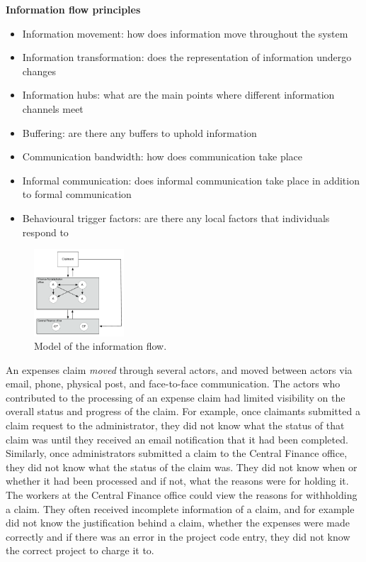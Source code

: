 \begin{framed}\noindent
\textbf{Information flow principles}
\begin{itemize}
\item Information movement: how does information move throughout the system
\item Information transformation: does the representation of information undergo changes
\item Information hubs: what are the main points where different information channels meet
\item Buffering: are there any buffers to uphold information
\item Communication bandwidth: how does communication take place
\item Informal communication: does informal communication take place in addition to formal communication
\item Behavioural trigger factors: are there any local factors that individuals respond to
\end{itemize}
\end{framed}

\begin{figure}[!ht]
\centering
\includegraphics[width=0.3\textwidth]{images/ch12/ch12_infmodel.pdf}
\caption[Study 2 Information flow model]{Model of the information flow.}
\vspace{-9pt}
\label{fig:ch12_infmod}
\end{figure}


An expenses claim \textit{moved} through several actors, and moved between actors via email, phone, physical post, and face-to-face communication. The actors who contributed to the processing of an expense claim had limited visibility on the overall status and progress of the claim. For example, once claimants submitted a claim request to the administrator, they did not know what the status of that claim was until they received an email notification that it had been completed. Similarly, once administrators submitted a claim to the Central Finance office, they did not know what the status of the claim was. They did not know when or whether it had been processed and if not, what the reasons were for holding it. The workers at the Central Finance office could view the reasons for withholding a claim. They often received incomplete information of a claim, and for example did not know the justification behind a claim, whether the expenses were made correctly and if there was an error in the project code entry, they did not know the correct project to charge it to.

